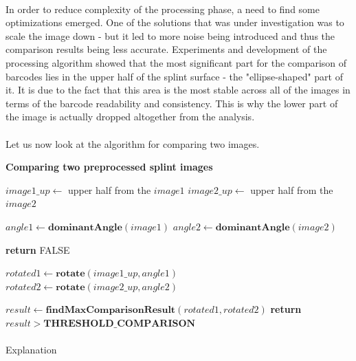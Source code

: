 \paragraph{}
In order to reduce complexity of the processing phase, a need to find some optimizations emerged. One of the solutions that was under investigation was to scale the image down - but it led to more noise being introduced and thus the comparison results being less accurate. Experiments and development of the processing algorithm showed that the most significant part for the comparison of barcodes lies in the upper half of the splint surface - the "ellipse-shaped" part of it. It is due to the fact that this area is the most stable across all of the images in terms of the barcode readability and consistency. This is why the lower part of the image is actually dropped altogether from the analysis.

\paragraph{}
Let us now look at the algorithm for comparing two images. 

\begin{algorithm}{\textbf{Comparing two preprocessed splint images}}
	\begin{spacing}{1.5}
	\begin{algorithmic}[1]
			\State $image1\_up \gets$ upper half from the $image1$
			\State $image2\_up \gets$ upper half from the $image2$
			
			\State $angle1 \gets \textbf{dominantAngle}(image1)$
			\State $angle2 \gets \textbf{dominantAngle}(image2)$
			
				\State \textbf{return} FALSE
			\EndIf
			
			\State $rotated1 \gets \textbf{rotate}(image1\_up, angle1)$
			\State $rotated2 \gets \textbf{rotate}(image2\_up, angle2)$
			
			\State $result \gets \textbf{findMaxComparisonResult}(rotated1, rotated2)$
			\State \textbf{return} $result > \textbf{THRESHOLD\_COMPARISON}$
		\EndFunction
	\end{algorithmic}
	\end{spacing}
\end{algorithm}

\paragraph{}
Explanation

